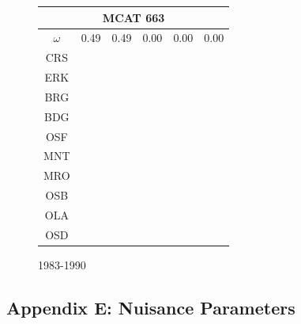 \documentclass[12pt]{article}
\begin{document}
\begin{landscape}
\begin{figure}
\begin{minipage}[c]{0.3\textwidth}
\begin{tabular}{|c|c|c|c|c|c|}
         \hline \multicolumn{6}{|c|}{MCAT 663} \\ \hline
         $\omega$&0.49&0.49&0.00&0.00&0.00 \\ \hline
        CRS&\cellcolor[HTML]{E41A1C}&\cellcolor[HTML]{E41A1C}&\cellcolor[HTML]{E41A1C}&\cellcolor[HTML]{E41A1C}&\cellcolor[HTML]{E41A1C} \\ \hline
        ERK&\cellcolor[HTML]{E41A1C}&\cellcolor[HTML]{377EB8}&\cellcolor[HTML]{E41A1C}&\cellcolor[HTML]{E41A1C}&\cellcolor[HTML]{E41A1C} \\ \hline
        BRG&\cellcolor[HTML]{377EB8}&\cellcolor[HTML]{377EB8}&\cellcolor[HTML]{E41A1C}&\cellcolor[HTML]{377EB8}&\cellcolor[HTML]{377EB8} \\ \hline
        BDG&\cellcolor[HTML]{4DAF4A}&\cellcolor[HTML]{4DAF4A}&\cellcolor[HTML]{377EB8}&\cellcolor[HTML]{377EB8}&\cellcolor[HTML]{4DAF4A} \\ \hline
        OSF&\cellcolor[HTML]{984EA3}&\cellcolor[HTML]{984EA3}&\cellcolor[HTML]{377EB8}&\cellcolor[HTML]{377EB8}&\cellcolor[HTML]{984EA3} \\ \hline
        MNT&\cellcolor[HTML]{984EA3}&\cellcolor[HTML]{984EA3}&\cellcolor[HTML]{4DAF4A}&\cellcolor[HTML]{4DAF4A}&\cellcolor[HTML]{984EA3} \\ \hline
        MRO&\cellcolor[HTML]{FF7F00}&\cellcolor[HTML]{FF7F00}&\cellcolor[HTML]{4DAF4A}&\cellcolor[HTML]{4DAF4A}&\cellcolor[HTML]{984EA3} \\ \hline
        OSB&\cellcolor[HTML]{FFFF33}&\cellcolor[HTML]{FFFF33}&\cellcolor[HTML]{984EA3}&\cellcolor[HTML]{4DAF4A}&\cellcolor[HTML]{FF7F00} \\ \hline
        OLA&\cellcolor[HTML]{A65628}&\cellcolor[HTML]{A65628}&\cellcolor[HTML]{984EA3}&\cellcolor[HTML]{984EA3}&\cellcolor[HTML]{FF7F00} \\ \hline
        OSD&\cellcolor[HTML]{F781BF}&\cellcolor[HTML]{F781BF}&\cellcolor[HTML]{FF7F00}&\cellcolor[HTML]{FF7F00}&\cellcolor[HTML]{FFFF33} \\ \hline
\end{tabular}
\end{minipage}
\caption{1983-1990}
\label{colorTabApp83}
\end{figure}
\end{landscape}

\subsection{Appendix E: Nuisance Parameters}\label{appE}
\end{document}

